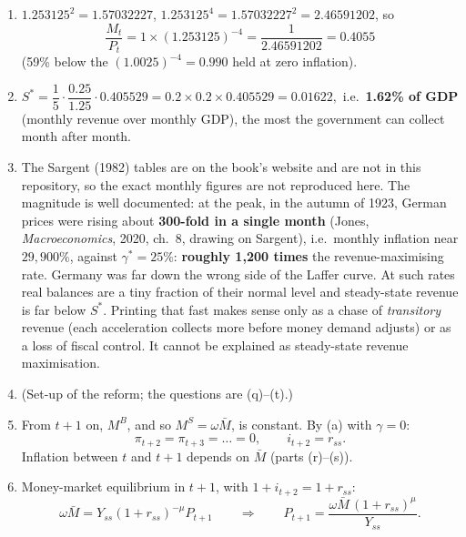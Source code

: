 \documentclass[12pt, letterpaper]{article}
\newcommand{\Ms}{M^{S}}
\newcommand{\MBase}{M^{B}}
\begin{document}
\begin{tcolorbox}[evenbox,title={Problem 11.6 \quad Seignorage with High Inflation}]
\begin{enumerate}
\item $1.253125^2=1.57032227$, $1.253125^4=1.57032227^2=2.46591202$, so
\[
\frac{M_t}{P_t}=1\times(1.253125)^{-4}=\frac{1}{2.46591202}=\boxed{0.4055}
\]
(59\% below the $(1.0025)^{-4}=0.990$ held at zero inflation).

\item $S^\ast=\dfrac{1}{5}\cdot\dfrac{0.25}{1.25}\cdot0.405529=0.2\times0.2\times0.405529
=\boxed{0.01622},$ i.e.\ \textbf{1.62\% of GDP} (monthly revenue over monthly GDP), the most the
government can collect month after month.

\item The Sargent (1982) tables are on the book's website and are not in this repository, so
the exact monthly figures are not reproduced here. The magnitude is well documented: at the peak,
in the autumn of 1923, German prices were rising about \textbf{300-fold in a single month}
(Jones, \emph{Macroeconomics}, 2020, ch.~8, drawing on Sargent), i.e.\ monthly inflation near
$29{,}900\%$, against $\gamma^\ast=25\%$: \textbf{roughly 1{,}200 times} the revenue-maximising
rate. Germany was far down the wrong side of the Laffer curve. At such rates real balances are a
tiny fraction of their normal level and steady-state revenue is far below $S^\ast$. Printing that
fast makes sense only as a chase of \emph{transitory} revenue (each acceleration collects more
before money demand adjusts) or as a loss of fiscal control. It cannot be explained as
steady-state revenue maximisation.

\item[(p)] (Set-up of the reform; the questions are (q)--(t).)

\item[(q)] From $t+1$ on, $\MBase$, and so $\Ms=\omega\bar M$, is constant. By (a) with $\gamma=0$:
\[
\boxed{\pi_{t+2}=\pi_{t+3}=\dots=0,\qquad i_{t+2}=r_{ss}.}
\]
Inflation between $t$ and $t+1$ depends on $\bar M$ (parts (r)--(s)).

\item[(r)] Money-market equilibrium in $t+1$, with $1+i_{t+2}=1+r_{ss}$:
\[
\omega\bar M=Y_{ss}(1+r_{ss})^{-\mu}P_{t+1}
\qquad\Longrightarrow\qquad
\boxed{P_{t+1}=\frac{\omega\bar M\,(1+r_{ss})^{\mu}}{Y_{ss}}.}
\]


\end{enumerate}
\end{tcolorbox}
\end{document}
